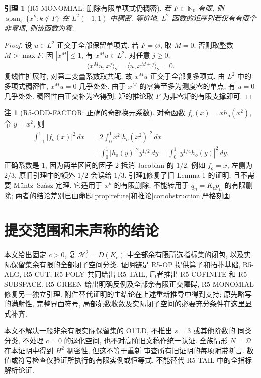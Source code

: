 \documentclass[UTF8,fontset=fandol,11pt,a4paper]{ctexart}
\newtheorem{lemma}[theorem]{引理}
\theoremstyle{definition}
\newtheorem{remark}[theorem]{注}
\newcommand{\C}{\mathbb C}
\newcommand{\N}{\mathbb N}
\newcommand{\Hc}{\mathcal H_c^2}
\newcommand{\LL}{L^2(-1,1)}
\newcommand{\spn}{\operatorname{span}_{\C}}
\newcommand{\ip}[2]{\langle #1,#2\rangle_2}
\begin{document}
\begin{lemma}[R5-MONOMIAL: 删除有限单项式仍稠密]\label{lem:monomials}
若 $F\subset\N_0$ 有限, 则 $\spn\{x^k:k\notin F\}$ 在 $\LL$ 中稠密.
等价地, $L^2$ 函数的矩序列若仅有有限个非零项, 则该函数为零.
\end{lemma}

\begin{proof}
设 $u\in L^2$ 正交于全部保留单项式. 若 $F=\varnothing$, 取 $M=0$;
否则取整数 $M>\max F$. 因 $|x^M|\le1$, 有 $x^Mu\in L^2$.
对任意 $j\ge0$,
\[
\ip{x^Mu}{x^j}=\ip{u}{x^{M+j}}=0.
\]
复线性扩展时, 对第二变量系数取共轭, 故 $x^Mu$ 正交于全部复多项式.
由 $L^2$ 中的多项式稠密性, $x^Mu=0$ 几乎处处.
由于 $x^M$ 的零集至多为测度零的单点, 有 $u=0$ 几乎处处.
稠密性由正交补为零得到; 矩的推论取 $F$ 为非零矩的有限支撑即可.
\end{proof}

\begin{remark}[R5-ODD-FACTOR: 正确的奇部换元系数]
对奇函数 $f_o(x)=xh_o(x^2)$, 令 $y=x^2$, 则
\begin{equation}\label{eq:oddfactor}
\begin{split}
\int_{-1}^1|f_o(x)|^2\,dx
&=2\int_0^1x^2|h_o(x^2)|^2\,dx\\
&=\int_0^1|h_o(y)|^2y^{1/2}\,dy
=\int_0^1|y^{1/4}h_o(y)|^2\,dy.
\end{split}
\end{equation}
正确系数是 $1$, 因为两半区间的因子 $2$ 抵消 Jacobian 的 $1/2$.
例如 $f_o=x$, 左侧为 $2/3$, 原旧引理中的额外 $1/2$ 会误给 $1/3$.
引理\ref{lem:monomials}修复了旧 Lemma 1 的证明, 且不需要 Müntz--Szász 定理.
它适用于 $x^k$ 的有限删除, 不能转用于 $q_n=K_cp_n$ 的有限删除;
两者的结论差别已由命题\ref{prop:refute}和推论\ref{cor:obstruction}严格刻画.
\end{remark}

\section{提交范围和未声称的结论}
\label{sec:boundaries}

本文给出固定 $c>0$, 复 $\Hc=D(K_c)$ 中全部余有限所选指标集的闭包,
以及实际保留集余有限的全部闭子空间分类. 证明链是
R5-OP 提供算子和拓扑基础, R5-ALG, R5-CUT, R5-POLY 共同给出 R5-TAIL,
后者推出 R5-COFINITE 和 R5-SUBSPACE.
R5-GREEN 给出明确反例及全部余有限正交障碍, R5-MONOMIAL 修复另一独立引理.
附件替代证明的主结论在上述重新推导中得到支持; 原先略写的满射性,
完整界面符号, 局部范数收敛及实际闭子空间的必要充分条件在这里显式补齐.

本文不解决一般非余有限实际保留集的 O1'LD, 不推出 $s=3$ 或其他阶数的
同类分类, 不处理 $c=0$ 的退化空间, 也不对高阶旧文稿作统一认证.
全族情形 $N=\mathcal D$ 在本证明中得到 $H^2$ 稠密性, 但这不等于重新
审查所有旧证明的每项附带断言. 数值或符号检查仅验证所执行的有限实例或恒等式,
不能替代 R5-TAIL 中的全指标解析论证.
\end{document}
